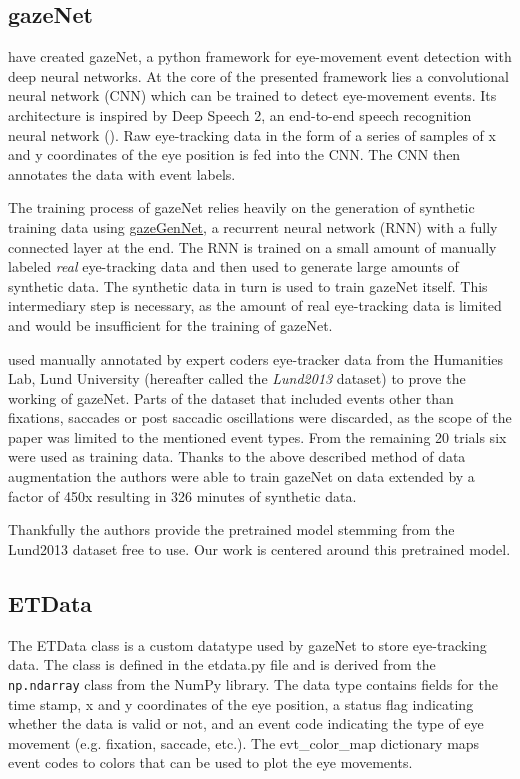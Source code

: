 \documentclass[conference]{IEEEtran}
\begin{document}
\subsection{gazeNet}
\cite{zemblys2018gazeNet} have created gazeNet, a python framework for eye-movement event detection with deep neural networks. At the core of the presented framework lies a convolutional neural network (CNN) which can be trained to detect eye-movement events. Its architecture is inspired by Deep Speech 2, an end-to-end speech recognition neural network (\cite{deep_speech_2,zemblys2018gazeNet}). Raw eye-tracking data in the form of a series of samples of x and y coordinates of the eye position is fed into the CNN. The CNN then annotates the data with event labels.

The training process of gazeNet relies heavily on the generation of synthetic training data using \href{https://github.com/r-zemblys/gazeGenNet}{gazeGenNet}, a recurrent neural network (RNN) with a fully connected layer at the end. The RNN is trained on a small amount of manually labeled \emph{real} eye-tracking data and then used to generate large amounts of synthetic data. The synthetic data in turn is used to train gazeNet itself. This intermediary step is necessary, as the amount of real eye-tracking data is limited and would be insufficient for the training of gazeNet. \cite{zemblys2018gazeNet}

\cite{zemblys2018gazeNet} used manually annotated by expert coders eye-tracker data from the Humanities Lab, Lund University (hereafter called the \emph{Lund2013} dataset) to prove the working of gazeNet. Parts of the dataset that included events other than fixations, saccades or post saccadic oscillations were discarded, as the scope of the paper was limited to the mentioned event types. From the remaining 20 trials six were used as training data. Thanks to the above described method of data augmentation the authors were able to train gazeNet on data extended by a factor of 450x resulting in 326 minutes of synthetic data.

Thankfully the authors provide the pretrained model stemming from the Lund2013 dataset free to use. Our work is centered around this pretrained model.

\subsection{ETData}
The ETData class is a custom datatype used by gazeNet to store eye-tracking data. The class is defined in the etdata.py file and is derived from the \verb|np.ndarray| class from the NumPy library. The data type contains fields for the time stamp, x and y coordinates of the eye position, a status flag indicating whether the data is valid or not, and an event code indicating the type of eye movement (e.g. fixation, saccade, etc.). The evt\_color\_map dictionary maps event codes to colors that can be used to plot the eye movements.
\end{document}
